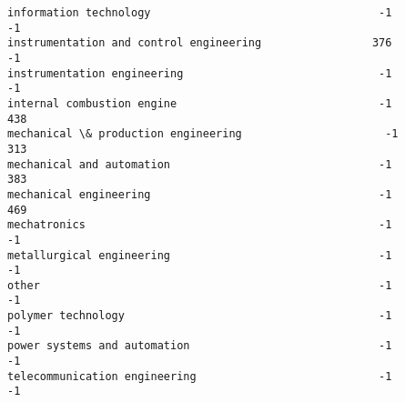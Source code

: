 \documentclass[11pt]{article}
\begin{document}
\begin{tcolorbox}[breakable, size=fbox, boxrule=.5pt, pad at break*=1mm, opacityfill=0]
\begin{Verbatim}[commandchars=\\\{\}]
information technology                                   -1              -1
instrumentation and control engineering                 376              -1
instrumentation engineering                              -1              -1
internal combustion engine                               -1             438
mechanical \& production engineering                      -1             313
mechanical and automation                                -1             383
mechanical engineering                                   -1             469
mechatronics                                             -1              -1
metallurgical engineering                                -1              -1
other                                                    -1              -1
polymer technology                                       -1              -1
power systems and automation                             -1              -1
telecommunication engineering                            -1              -1


\end{Verbatim}
\end{tcolorbox}
\end{document}
